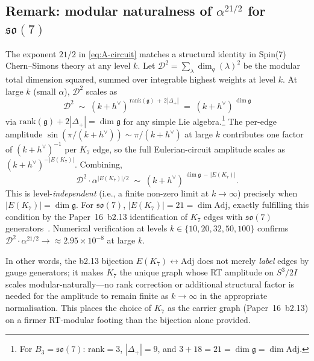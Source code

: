 \documentclass[11pt]{article}
\newcommand{\so}{\mathfrak{so}}
\newcommand{\Adj}{\mathrm{Adj}}
\newcommand{\hv}{h^{\vee}}
\begin{document}
\subsection{Remark: modular naturalness of $\alpha^{21/2}$ for $\so(7)$}
\label{sec:modular-naturalness}

The exponent $21/2$ in \eqref{eq:A-circuit} matches a structural
identity in Spin(7) Chern--Simons theory at any level $k$.  Let
$\mathcal{D}^2 = \sum_\lambda \dim_q(\lambda)^2$ be the modular total
dimension squared, summed over integrable highest weights at
level $k$.  At large $k$ (small $\alpha$), $\mathcal{D}^2$ scales as
\begin{equation}
  \mathcal{D}^2 \;\sim\; (k + \hv)^{\,\mathrm{rank}(\mathfrak{g})\,+\,2|\Delta_+|}
                 \;=\; (k + \hv)^{\,\dim \mathfrak{g}}
\end{equation}
via $\mathrm{rank}(\mathfrak{g}) + 2|\Delta_+| = \dim \mathfrak{g}$
for any simple Lie algebra.\footnote{For
$B_3 = \so(7)$: $\mathrm{rank} = 3$, $|\Delta_+| = 9$, and
$3 + 18 = 21 = \dim \mathfrak{g} = \dim \Adj$.}  The per-edge
amplitude $\sin(\pi/(k+\hv)) \sim \pi/(k+\hv)$ at large $k$ contributes
one factor of $(k+\hv)^{-1}$ per $K_7$ edge, so the full
Eulerian-circuit amplitude scales as $(k+\hv)^{-|E(K_7)|}$.  Combining,
\begin{equation}
  \mathcal{D}^2 \cdot \alpha^{|E(K_7)|/2}
  \;\sim\; (k + \hv)^{\,\dim \mathfrak{g} \,-\, |E(K_7)|}.
\end{equation}
This is level-\emph{independent} (i.e., a finite non-zero limit at
$k \to \infty$) precisely when $|E(K_7)| = \dim \mathfrak{g}$.  For
$\so(7)$, $|E(K_7)| = 21 = \dim \Adj$, exactly fulfilling this
condition by the Paper~16~b2.13 identification of $K_7$ edges with
$\so(7)$ generators~\cite{paper16}.  Numerical verification at levels
$k \in \{10, 20, 32, 50, 100\}$ confirms
$\mathcal{D}^2 \cdot \alpha^{21/2} \to \approx 2.95 \times 10^{-8}$
at large $k$.

In other words, the b2.13 bijection $E(K_7) \leftrightarrow \Adj$
does not merely \emph{label} edges by gauge generators; it makes
$K_7$ the unique graph whose RT amplitude on $S^3/2I$ scales
modular-naturally---no rank correction or additional structural
factor is needed for the amplitude to remain finite as
$k \to \infty$ in the appropriate normalisation.  This places
the choice of $K_7$ as the carrier graph (Paper~16~b2.13) on a
firmer RT-modular footing than the bijection alone provided.

\end{document}
